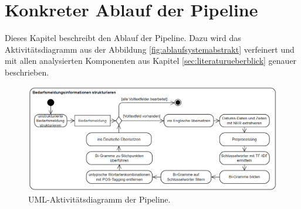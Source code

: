 \section{Konkreter Ablauf der Pipeline}
Dieses Kapitel beschreibt den Ablauf der Pipeline. Dazu wird das Aktivitätsdiagramm aus der Abbildung \ref{fig:ablaufsystemabstrakt} verfeinert und mit allen analysierten Komponenten aus Kapitel \ref{sec:literaturueberblick} genauer beschrieben.
\begin{figure}[H]
	\centering  
	\includegraphics[width=\linewidth]{Abbildungen/flowchart.png}
	\caption{UML-Aktivitätsdiagramm der Pipeline.}
	\label{fig:flowchart}
\end{figure}\mbox{} \\
